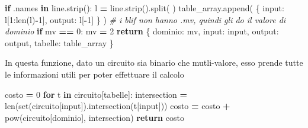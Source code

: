 \documentclass[
  italian,
]{book}
\newenvironment{Shaded}{\begin{snugshade}}{\end{snugshade}}
\newcommand{\BuiltInTok}[1]{#1}
\newcommand{\CommentTok}[1]{\textcolor[rgb]{0.56,0.35,0.01}{\textit{#1}}}
\newcommand{\ControlFlowTok}[1]{\textcolor[rgb]{0.13,0.29,0.53}{\textbf{#1}}}
\newcommand{\DecValTok}[1]{\textcolor[rgb]{0.00,0.00,0.81}{#1}}
\newcommand{\KeywordTok}[1]{\textcolor[rgb]{0.13,0.29,0.53}{\textbf{#1}}}
\newcommand{\NormalTok}[1]{#1}
\newcommand{\OperatorTok}[1]{\textcolor[rgb]{0.81,0.36,0.00}{\textbf{#1}}}
\newcommand{\StringTok}[1]{\textcolor[rgb]{0.31,0.60,0.02}{#1}}
\begin{document}
\begin{Shaded}
\begin{Highlighting}[]
        \ControlFlowTok{if} \StringTok{\textquotesingle{}.names\textquotesingle{}} \KeywordTok{in}\NormalTok{ line.strip():}
\NormalTok{            l }\OperatorTok{=}\NormalTok{ line.strip().split(}\StringTok{\textquotesingle{} \textquotesingle{}}\NormalTok{)}
\NormalTok{            table\_array.append(}
\NormalTok{                \{}
                    \StringTok{\textquotesingle{}input\textquotesingle{}}\NormalTok{:    l[}\DecValTok{1}\NormalTok{:}\BuiltInTok{len}\NormalTok{(l)}\OperatorTok{{-}}\DecValTok{1}\NormalTok{],}
                    \StringTok{\textquotesingle{}output\textquotesingle{}}\NormalTok{:   l[}\OperatorTok{{-}}\DecValTok{1}\NormalTok{]}
\NormalTok{                \}}
\NormalTok{            )}
    \CommentTok{\# i blif non hanno .mv, quindi gli do il valore di dominio}
    \ControlFlowTok{if}\NormalTok{ mv }\OperatorTok{==} \DecValTok{0}\NormalTok{:}
\NormalTok{        mv }\OperatorTok{=} \DecValTok{2}
    \ControlFlowTok{return}\NormalTok{ \{}
        \StringTok{\textquotesingle{}dominio\textquotesingle{}}\NormalTok{:   mv,}
        \StringTok{\textquotesingle{}input\textquotesingle{}}\NormalTok{:    }\BuiltInTok{input}\NormalTok{,}
        \StringTok{\textquotesingle{}output\textquotesingle{}}\NormalTok{:   output,}
        \StringTok{\textquotesingle{}tabelle\textquotesingle{}}\NormalTok{:  table\_array}
\NormalTok{    \}}
\end{Highlighting}
\end{Shaded}

In questa funzione, dato un circuito sia binario che mutli-valore, esso prende tutte le informazioni utili per poter effettuare il calcolo

\begin{Shaded}
\begin{Highlighting}[]
\NormalTok{costo }\OperatorTok{=} \DecValTok{0}
\ControlFlowTok{for}\NormalTok{ t }\KeywordTok{in}\NormalTok{ circuito[}\StringTok{\textquotesingle{}tabelle\textquotesingle{}}\NormalTok{]:}
\NormalTok{    intersection }\OperatorTok{=} \BuiltInTok{len}\NormalTok{(}\BuiltInTok{set}\NormalTok{(circuito[}\StringTok{\textquotesingle{}input\textquotesingle{}}\NormalTok{]).intersection(t[}\StringTok{\textquotesingle{}input\textquotesingle{}}\NormalTok{]))}
\NormalTok{    costo }\OperatorTok{=}\NormalTok{ costo }\OperatorTok{+} \BuiltInTok{pow}\NormalTok{(circuito[}\StringTok{\textquotesingle{}dominio\textquotesingle{}}\NormalTok{], intersection)}
\ControlFlowTok{return}\NormalTok{ costo}
\end{Highlighting}
\end{Shaded}
\end{document}
